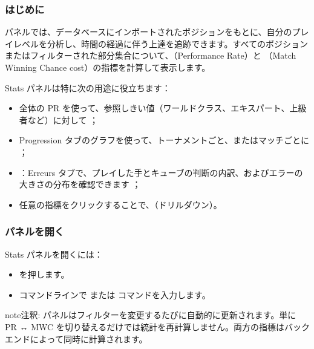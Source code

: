 \documentclass[letterpaper,10pt,dvipdfmx]{sphinxmanual}
\begin{document}
\subsubsection{はじめに}
\label{\detokenize{manuel:id9}}
\sphinxAtStartPar
{} パネルでは、データベースにインポートされたポジションをもとに、自分のプレイレベルを分析し、時間の経過に伴う上達を追跡できます。すべてのポジションまたはフィルターされた部分集合について、（Performance Rate）と （Match Winning Chance cost）の指標を計算して表示します。

\sphinxAtStartPar
Stats パネルは特に次の用途に役立ちます：
\begin{itemize}
\item {} 
\sphinxAtStartPar
全体の PR を使って、参照しきい値（ワールドクラス、エキスパート、上級者など）に対して  ；

\item {} 
\sphinxAtStartPar
Progression タブのグラフを使って、トーナメントごと、またはマッチごとに  ；

\item {} 
\sphinxAtStartPar
{} ：Erreurs タブで、プレイした手とキューブの判断の内訳、およびエラーの大きさの分布を確認できます ；

\item {} 
\sphinxAtStartPar
任意の指標をクリックすることで、（ドリルダウン）。

\end{itemize}


\subsubsection{パネルを開く}
\label{\detokenize{manuel:ouverture-du-panneau}}
\sphinxAtStartPar
Stats パネルを開くには：
\begin{itemize}
\item {} 
\sphinxAtStartPar
{} を押します。

\item {} 
\sphinxAtStartPar
コマンドラインで  または  コマンドを入力します。

\end{itemize}

\begin{sphinxadmonition}{note}{注釈:}
\sphinxAtStartPar
パネルはフィルターを変更するたびに自動的に更新されます。単に PR ↔ MWC を切り替えるだけでは統計を再計算しません。両方の指標はバックエンドによって同時に計算されます。
\end{sphinxadmonition}
\end{document}
